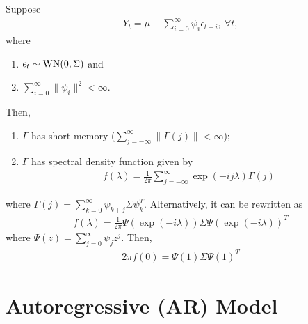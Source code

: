 \documentclass[11pt]{elegantbook}
\begin{document}
\begin{example}
    Suppose
    \begin{equation}
        \begin{aligned}
            Y_t=\mu+\sum_{i=0}^\infty\psi_i\epsilon_{t-i},\ \forall t,
        \end{aligned}
        \nonumber
    \end{equation}
    where
    \begin{enumerate}[$\cdot$]
        \item $\epsilon_t\sim \textnormal{WN}(0,\Sigma)$ and
        \item $\sum_{i=0}^\infty\|\psi_i\|^2<\infty$.
    \end{enumerate}
    Then,
    \begin{enumerate}[$\circ$]
        \item $\Gamma$ has short memory ($\sum_{j=-\infty}^\infty \|\Gamma(j)\|<\infty$);
        \item $\Gamma$ has spectral density function given by
        \begin{equation}
            \begin{aligned}
                f(\lambda)=\frac{1}{2\pi}\sum_{j=-\infty}^\infty \exp\left(-ij\lambda\right)\Gamma(j)
            \end{aligned}
            \nonumber
        \end{equation}
    \end{enumerate}
    where $\Gamma(j)=\sum_{k=0}^\infty\psi_{k+j}\Sigma\psi_{k}^T$.
    Alternatively, it can be rewritten as
    \begin{equation}
        \begin{aligned}
            f(\lambda)=\frac{1}{2\pi}\Psi(\exp\left(-i\lambda\right))\Sigma\Psi(\exp\left(-i\lambda\right))^T
        \end{aligned}
        \nonumber
    \end{equation}
    where $\Psi(z)=\sum_{j=0}^\infty\psi_jz^j$.
    Then,
    \begin{equation}
        \begin{aligned}
            2\pi f(0)=\Psi(1)\Sigma\Psi(1)^T
        \end{aligned}
        \nonumber
    \end{equation}
\end{example}



\chapter{Autoregressive (AR) Model}
\end{document}
